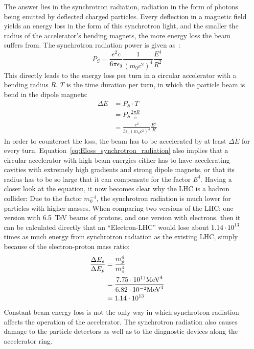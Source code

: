 The answer lies in the synchrotron radiation, radiation in the form of photons being emitted by deflected charged particles.
Every deflection in a magnetic field yields an energy loss in the form of this synchrotron light, and the smaller the radius of the accelerator's bending magnets, the more energy loss the beam suffers from.
The synchrotron radiation power is given as~\cite[p. 33]{Wille}:
\begin{equation}
 P_S = \frac{e^2c}{6\pi\epsilon_0}\frac{1}{(m_0c^2)^4}\frac{E^4}{R^2}
\end{equation}
This directly leads to the energy loss per turn in a circular accelerator with a bending radius $R$.
$T$ is the time duration per turn, in which the particle beam is bend in the dipole magnets:
\begin{align}
 \Delta E &= P_S\cdot T\\
 &= P_S\frac{2\pi R}{c}\\
 &=\frac{e^2}{3\epsilon_0(m_0c^2)^4}\frac{E^4}{R} \label{eq:Eloss_synchrotron_radiation}
\end{align}
In order to counteract the loss, the beam has to be accelerated by at least $\Delta E$ for every turn.
Equation~\ref{eq:Eloss_synchrotron_radiation} also implies that a circular accelerator with high beam energies either has to have accelerating cavities with extremely high gradients and strong dipole magnets, or that its radius has to be so large that it can compensate for the factor $E^4$.
Having a closer look at the equation, it now becomes clear why the LHC is a hadron collider:
Due to the factor $m_0^{-4}$, the synchrotron radiation is much lower for particles with higher masses.
When comparing two versions of the LHC: one version with \SI{6.5}{\TeV} beams of protons, and one version with electrons, then it can be calculated directly that an ``Electron-LHC'' would lose about 1.14\,$\cdot\,10^{13}$ times as much energy from synchrotron radiation as the existing LHC, simply because of the electron-proton mass ratio:
\begin{align*}
 \frac{\Delta E_e}{\Delta E_p} &=\frac{m_p^4}{m_e^4}\\
 &= \frac{7.75\cdot10^{11} \textnormal{MeV}^4}{6.82\cdot10^{-2} \textnormal{MeV}^4}\\
 &=1.14\cdot10^{13}
\end{align*}
Constant beam energy loss is not the only way in which synchrotron radiation affects the operation of the accelerator.
The synchrotron radiation also causes damage to the particle detectors as well as to the diagnostic devices along the accelerator ring.
